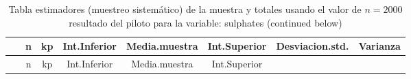 \documentclass[
]{article}
\begin{document}
\begin{longtable}[]{@{}cccccccc@{}}
\caption{Tabla estimadores (muestreo sistemático) de la muestra y
totales usando el valor de \(n = 2000\) resultado del piloto para la
variable: sulphates (continued below)}\tabularnewline
\toprule
\begin{minipage}[b]{0.18\columnwidth}\centering
~\strut
\end{minipage} & \begin{minipage}[b]{0.05\columnwidth}\centering
n\strut
\end{minipage} & \begin{minipage}[b]{0.03\columnwidth}\centering
kp\strut
\end{minipage} & \begin{minipage}[b]{0.10\columnwidth}\centering
Int.Inferior\strut
\end{minipage} & \begin{minipage}[b]{0.11\columnwidth}\centering
Media.muestra\strut
\end{minipage} & \begin{minipage}[b]{0.10\columnwidth}\centering
Int.Superior\strut
\end{minipage} & \begin{minipage}[b]{0.12\columnwidth}\centering
Desviacion.std.\strut
\end{minipage} & \begin{minipage}[b]{0.08\columnwidth}\centering
Varianza\strut
\end{minipage}\tabularnewline
\midrule
\endfirsthead
\toprule
\begin{minipage}[b]{0.18\columnwidth}\centering
~\strut
\end{minipage} & \begin{minipage}[b]{0.05\columnwidth}\centering
n\strut
\end{minipage} & \begin{minipage}[b]{0.03\columnwidth}\centering
kp\strut
\end{minipage} & \begin{minipage}[b]{0.10\columnwidth}\centering
Int.Inferior\strut
\end{minipage} & \begin{minipage}[b]{0.11\columnwidth}\centering
Media.muestra\strut
\end{minipage} & \begin{minipage}[b]{0.10\columnwidth}\centering
Int.Superior\strut
\end{minipage} & \begin{minipage}[b]{0.12\columnwidth}\centering

\end{minipage}
\end{longtable}
\end{document}
